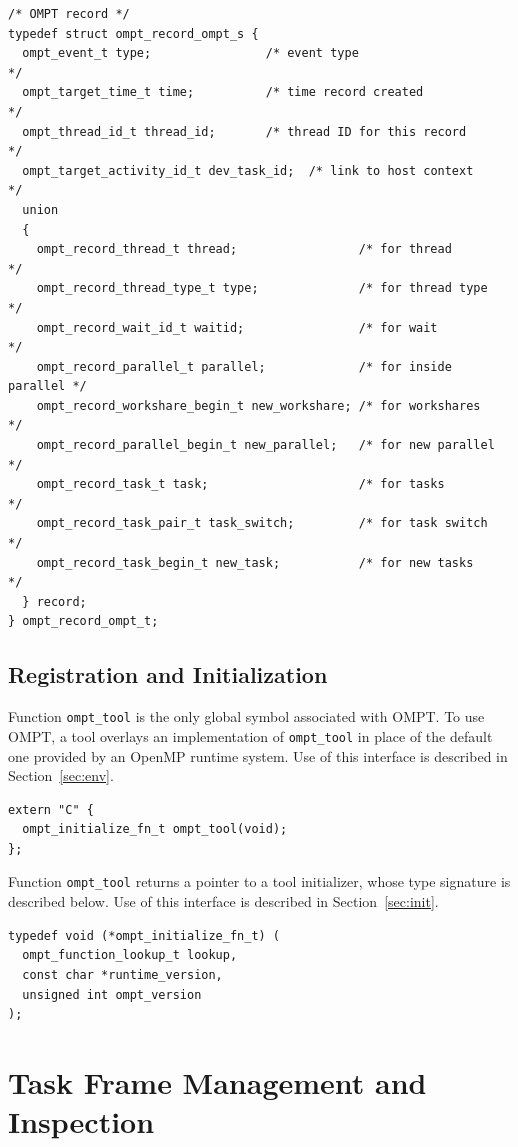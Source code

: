 \documentclass{article}
\begin{document}
{\begin{verbatim}
/* OMPT record */
typedef struct ompt_record_ompt_s {
  ompt_event_t type;                /* event type                       */
  ompt_target_time_t time;          /* time record created              */
  ompt_thread_id_t thread_id;       /* thread ID for this record        */
  ompt_target_activity_id_t dev_task_id;  /* link to host context       */
  union
  {
    ompt_record_thread_t thread;                 /* for thread          */
    ompt_record_thread_type_t type;              /* for thread type     */
    ompt_record_wait_id_t waitid;                /* for wait            */
    ompt_record_parallel_t parallel;             /* for inside parallel */
    ompt_record_workshare_begin_t new_workshare; /* for workshares      */
    ompt_record_parallel_begin_t new_parallel;   /* for new parallel    */
    ompt_record_task_t task;                     /* for tasks           */
    ompt_record_task_pair_t task_switch;         /* for task switch     */
    ompt_record_task_begin_t new_task;           /* for new tasks       */
  } record;
} ompt_record_ompt_t;
\end{verbatim}

\clearpage
\subsection{Registration and Initialization} 
\label{sec:app:init}

\noindent
Function \verb|ompt_tool| is the only global symbol associated with OMPT. To use OMPT, a tool overlays an implementation of \verb|ompt_tool| in place of the default one provided by an OpenMP runtime system. Use of this interface is described in Section~\ref{sec:env}.
\begin{verbatim}
extern "C" {
  ompt_initialize_fn_t ompt_tool(void);
};
\end{verbatim}
Function \verb|ompt_tool| returns a pointer to a tool initializer, whose type signature is described below. Use of this interface is described in Section~\ref{sec:init}.

\begin{verbatim}
typedef void (*ompt_initialize_fn_t) (
  ompt_function_lookup_t lookup,
  const char *runtime_version, 
  unsigned int ompt_version
);
\end{verbatim}



\clearpage
\section{Task Frame Management and Inspection}
\label{app:frame}

}
\end{document}
